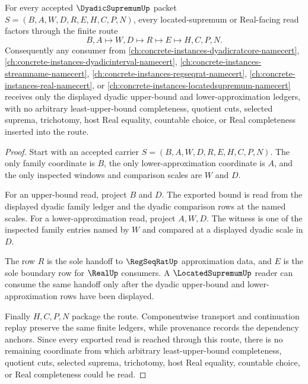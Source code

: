 \begin{theorem}
\label{thm:dyadic-supremum-located-cut-handoff}
For every accepted $\DyadicSupremumUp$ packet $S=(B,A,W,D,R,E,H,C,P,N)$, every located-supremum or Real-facing read factors through the finite route
$$
B,A \longmapsto W,D \longmapsto R \longmapsto E \longmapsto H,C,P,N .
$$
Consequently any consumer from \autoref{ch:concrete-instances-dyadicratcore-namecert}, \autoref{ch:concrete-instances-dyadicinterval-namecert}, \autoref{ch:concrete-instances-streamname-namecert}, \autoref{ch:concrete-instances-regseqrat-namecert}, \autoref{ch:concrete-instances-real-namecert}, or \autoref{ch:concrete-instances-locatedsupremum-namecert} receives only the displayed dyadic upper-bound and lower-approximation ledgers, with no arbitrary least-upper-bound completeness, quotient cuts, selected suprema, trichotomy, host Real equality, countable choice, or Real completeness inserted into the route.
\end{theorem}
\begin{proof}
Start with an accepted carrier $S=(B,A,W,D,R,E,H,C,P,N)$. The only family coordinate is $B$, the only lower-approximation coordinate is $A$, and the only inspected windows and comparison scales are $W$ and $D$.

For an upper-bound read, project $B$ and $D$. The exported bound is read from the displayed dyadic family ledger and the dyadic comparison rows at the named scales. For a lower-approximation read, project $A,W,D$. The witness is one of the inspected family entries named by $W$ and compared at a displayed dyadic scale in $D$.

The row $R$ is the sole handoff to $\RegSeqRatUp$ approximation data, and $E$ is the sole boundary row for $\RealUp$ consumers. A $\LocatedSupremumUp$ reader can consume the same handoff only after the dyadic upper-bound and lower-approximation rows have been displayed.

Finally $H,C,P,N$ package the route. Componentwise transport and continuation replay preserve the same finite ledgers, while provenance records the dependency anchors. Since every exported read is reached through this route, there is no remaining coordinate from which arbitrary least-upper-bound completeness, quotient cuts, selected suprema, trichotomy, host Real equality, countable choice, or Real completeness could be read.
\end{proof}

